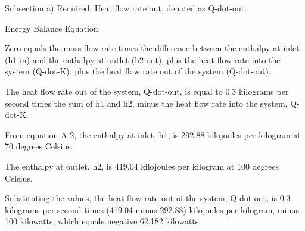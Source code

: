 Subsection a) Required: Heat flow rate out, denoted as Q-dot-out.

Energy Balance Equation:

Zero equals the mass flow rate times the difference between the enthalpy at inlet (h1-in) and the enthalpy at outlet (h2-out), plus the heat flow rate into the system (Q-dot-K), plus the heat flow rate out of the system (Q-dot-out).

The heat flow rate out of the system, Q-dot-out, is equal to 0.3 kilograms per second times the sum of h1 and h2, minus the heat flow rate into the system, Q-dot-K.

From equation A-2, the enthalpy at inlet, h1, is 292.88 kilojoules per kilogram at 70 degrees Celsius.

The enthalpy at outlet, h2, is 419.04 kilojoules per kilogram at 100 degrees Celsius.

Substituting the values, the heat flow rate out of the system, Q-dot-out, is 0.3 kilograms per second times (419.04 minus 292.88) kilojoules per kilogram, minus 100 kilowatts, which equals negative 62.182 kilowatts.